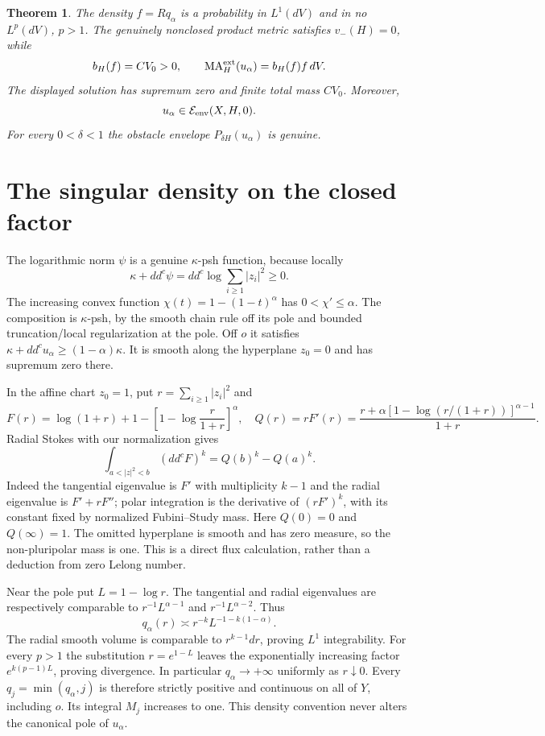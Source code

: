 \documentclass[11pt]{article}
\newcommand{\ddc}{dd^c}
\newcommand{\MA}{\operatorname{MA}}
\newtheorem{theorem}{Theorem}
\theoremstyle{remark}\newtheorem{remark}[theorem]{Remark}
\begin{document}
\begin{theorem}\label{th:product}
The density $f=R q_\alpha$ is a probability in $L^1(dV)$ and in no
$L^p(dV)$, $p>1$. The genuinely nonclosed product metric satisfies
$v_-(H)=0$, while
\[
 b_H(f)=C V_0>0,\qquad
 \MA_H^{\rm ext}(u_\alpha)=b_H(f)f\,dV.
\]
The displayed solution has supremum zero and finite total mass $CV_0$.
Moreover,
\[
 u_\alpha\in\mathcal E_{\rm env}(X,H,0).
\]
For every $0<\delta<1$
the obstacle envelope $P_{\delta H}(u_\alpha)$ is genuine.
\end{theorem}

\section{The singular density on the closed factor}
The logarithmic norm $\psi$ is a genuine $\kappa$-psh function, because locally
\[
 \kappa+\ddc\psi=\ddc\log\sum_{i\geq1}|z_i|^2\geq0.
\]
The increasing convex function $\chi(t)=1-(1-t)^\alpha$ has
$0<\chi'\leq\alpha$. The composition is $\kappa$-psh, by the smooth
chain rule off its pole and bounded truncation/local regularization
at the pole. Off $o$ it satisfies
$\kappa+\ddc u_\alpha\geq(1-\alpha)\kappa$. It is smooth along
the hyperplane $z_0=0$ and has supremum zero there.

In the affine chart $z_0=1$, put $r=\sum_{i\geq1}|z_i|^2$ and
\[
 F(r)=\log(1+r)+1-\left[1-\log\frac r{1+r}\right]^\alpha,
 \quad Q(r)=rF'(r)
 =\frac{r+\alpha[1-\log(r/(1+r))]^{\alpha-1}}{1+r}.
\]
Radial Stokes with our normalization gives
\[
 \int_{a<|z|^2<b}(\ddc F)^k=Q(b)^k-Q(a)^k.
\]
Indeed the tangential eigenvalue is $F'$ with multiplicity $k-1$ and
the radial eigenvalue is $F'+rF''$; polar integration is the derivative
of $(rF')^k$, with its constant fixed by normalized Fubini--Study mass.
Here $Q(0)=0$ and $Q(\infty)=1$. The omitted hyperplane is smooth and
has zero measure, so the non-pluripolar mass is one. This is a direct
flux calculation, rather than a deduction from zero Lelong number.

Near the pole put $L=1-\log r$. The tangential and radial eigenvalues
are respectively comparable to $r^{-1}L^{\alpha-1}$ and
$r^{-1}L^{\alpha-2}$. Thus
\begin{equation}\label{eq:density}
 q_\alpha(r)\asymp r^{-k}L^{-1-k(1-\alpha)}.
\end{equation}
The radial smooth volume is comparable to $r^{k-1}dr$, proving $L^1$
integrability. For every $p>1$ the substitution $r=e^{1-L}$ leaves
the exponentially increasing factor $e^{k(p-1)L}$, proving divergence.
In particular $q_\alpha\to+\infty$ uniformly as $r\downarrow0$.
Every $q_j=\min(q_\alpha,j)$ is therefore strictly positive and
continuous on all of $Y$, including $o$. Its integral $M_j$ increases
to one. This density convention never alters the canonical pole of $u_\alpha$.
\end{document}
